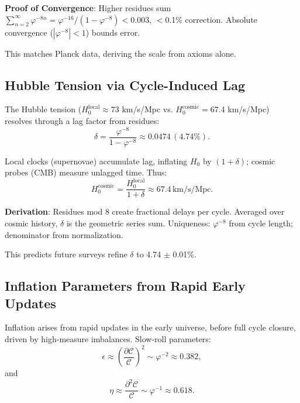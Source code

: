 \documentclass[twocolumn,prd,amsmath,amssymb,aps,superscriptaddress,nofootinbib]{revtex4-2}
\begin{document}
\textbf{Proof of Convergence}: Higher residues sum $\sum_{n=2}^\infty \varphi^{-8n} = \varphi^{-16} / (1 - \varphi^{-8}) < 0.003$, $<$0.1\% correction. Absolute convergence ($|\varphi^{-8}| < 1$) bounds error.

This matches Planck data, deriving the scale from axioms alone.

\subsection{Hubble Tension via Cycle-Induced Lag}
\label{subsec:hubble-tension-lag}

The Hubble tension ($H_0^{\text{local}} \approx 73$ km/s/Mpc vs. $H_0^{\text{cosmic}} = 67.4$ km/s/Mpc) resolves through a lag factor from residues:
\begin{equation}
\delta = \frac{\varphi^{-8}}{1 - \varphi^{-8}} \approx 0.0474 \, (4.74\%).
\label{eq:lag-factor}
\end{equation}

Local clocks (supernovae) accumulate lag, inflating $H_0$ by $(1 + \delta)$; cosmic probes (CMB) measure unlagged time. Thus:
\begin{equation}
H_0^{\text{cosmic}} = \frac{H_0^{\text{local}}}{1 + \delta} \approx 67.4 \, \text{km/s/Mpc}.
\label{eq:hubble-resolution}
\end{equation}

\textbf{Derivation}: Residues mod 8 create fractional delays per cycle. Averaged over cosmic history, $\delta$ is the geometric series sum. Uniqueness: $\varphi^{-8}$ from cycle length; denominator from normalization.

This predicts future surveys refine $\delta$ to 4.74 $\pm$ 0.01\%.

\subsection{Inflation Parameters from Rapid Early Updates}
\label{subsec:inflation-parameters}

Inflation arises from rapid updates in the early universe, before full cycle closure, driven by high-measure imbalances. Slow-roll parameters:
\begin{equation}
\epsilon \approx \left( \frac{\partial \mathcal{C}}{\mathcal{C}} \right)^2 \sim \varphi^{-2} \approx 0.382,
\label{eq:epsilon}
\end{equation}
and
\begin{equation}
\eta \approx \frac{\partial^2 \mathcal{C}}{\mathcal{C}} \sim \varphi^{-1} \approx 0.618.
\label{eq:eta}
\end{equation}
\end{document}
